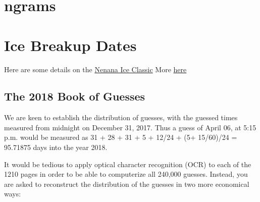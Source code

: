 \documentclass[]{book}
\begin{document}
\hypertarget{ngrams}{%
\section{ngrams}\label{ngrams}}

\hypertarget{ice-breakup-dates}{%
\section{Ice Breakup Dates}\label{ice-breakup-dates}}

Here are some details on the
\href{http://www.nenanaakiceclassic.com}{Nenana Ice Classic}
More \href{http://www.john-daly.com/nenana.htm}{here}

\hypertarget{the-2018-book-of-guesses}{%
\subsection{The 2018 Book of Guesses}\label{the-2018-book-of-guesses}}

We are keen to establish the distribution of guesses, with the guessed times measured from midnight on December 31, 2017. Thus a guess of April 06, at 5:15 p.m. would be measured as 31 + 28 + 31 + 5 + 12/24 + (5+ 15/60)/24 = 95.71875 days into the year 2018.

It would be tedious to apply optical character recognition (OCR) to each of the 1210 pages in order to be able to computerize all 240,000 guesses. Instead, you are asked to reconstruct the distribution of the guesses in two more economical ways:
\end{document}
